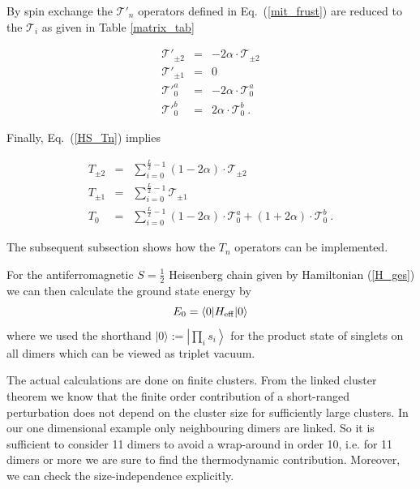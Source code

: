 By spin exchange the ${\mathcal{T}}'_{n}$ operators defined in
Eq.~(\ref{mit_frust}) are reduced to the 
${\mathcal{T}}_{i}$ as given in Table \ref{matrix_tab}
\begin{mathletters}
  \label{Tau_prime}
  \begin{eqnarray}
    {\mathcal{T}}'_{\pm2}&=&-2\alpha\cdot{\mathcal{T}}_{\pm2}\\
    {\mathcal{T}}'_{\pm1}&=&0\\
    {\mathcal{T}}'^a_{0}&=&-2\alpha\cdot{\mathcal{T}}_{0}^a\\
    {\mathcal{T}}'^b_{0}&=&2\alpha\cdot{\mathcal{T}}_{0}^b \ .
  \end{eqnarray}
\end{mathletters}
Finally, Eq.~(\ref{HS_Tn}) implies 
\begin{mathletters}
  \label{T_def}
  \begin{eqnarray}
    T_{\pm2} &=& \sum_{i=0}^{\frac{L}{2}-1}(1-2\alpha)\cdot{\mathcal{T}}_{\pm2}
 \\
    T_{\pm1} &=& \sum_{i=0}^{\frac{L}{2}-1}{\mathcal{T}}_{\pm1}\\
    T_{0} &=& \sum_{i=0}^{\frac{L}{2}-1}(1-2\alpha)\cdot{\mathcal{T}}^a_{0}+(1+
2\alpha)\cdot{\mathcal{T}}^b_{0} \ .
  \end{eqnarray}
\end{mathletters}
The subsequent subsection shows
 how the $T_{n}$ operators can be implemented. 
\pagebreak

For 
the antiferromagnetic $S=\frac{1}{2}$ Heisenberg chain given by 
Hamiltonian (\ref{H_ges}) we can then calculate the ground state energy by
\begin{equation}
\label{ground_en}
  E_0=\langle 0|H_{\rm{eff}}|0\rangle
\end{equation}
where we used the shorthand $|0\rangle:=\left|\prod_{i}s_i\right\rangle$
for the product state of singlets on all dimers which can be viewed
as triplet vacuum. 


The actual calculations are done on finite clusters. From the linked
cluster theorem we know that the finite order contribution of
 a short-ranged perturbation does not depend on the cluster size
for sufficiently large clusters. In our one dimensional example
only neighbouring dimers are linked.  So it is sufficient
to consider 11 dimers to avoid a wrap-around in order 10, i.e.
for 11 dimers or more we are sure to find the thermodynamic
contribution. Moreover, we can check the size-independence
explicitly.


